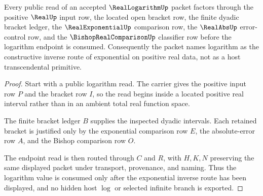 \begin{theorem}
\label{thm:real-logarithm-exponential-inverse-route}
Every public read of an accepted $\RealLogarithmUp$ packet factors through the positive $\RealUp$ input row, the located open bracket row, the finite dyadic bracket ledger, the $\RealExponentialUp$ comparison row, the $\RealAbsUp$ error-control row, and the $\BishopRealComparisonUp$ classifier row before the logarithm endpoint is consumed. Consequently the packet names logarithm as the constructive inverse route of exponential on positive real data, not as a host transcendental primitive.
\end{theorem}
\begin{proof}
Start with a public logarithm read. The carrier gives the positive input row $P$ and the bracket row $I$, so the read begins inside a located positive real interval rather than in an ambient total real function space.

The finite bracket ledger $B$ supplies the inspected dyadic intervals. Each retained bracket is justified only by the exponential comparison row $E$, the absolute-error row $A$, and the Bishop comparison row $O$.

The endpoint read is then routed through $C$ and $R$, with $H,K,N$ preserving the same displayed packet under transport, provenance, and naming. Thus the logarithm value is consumed only after the exponential inverse route has been displayed, and no hidden host $\log$ or selected infinite branch is exported.
\end{proof}

